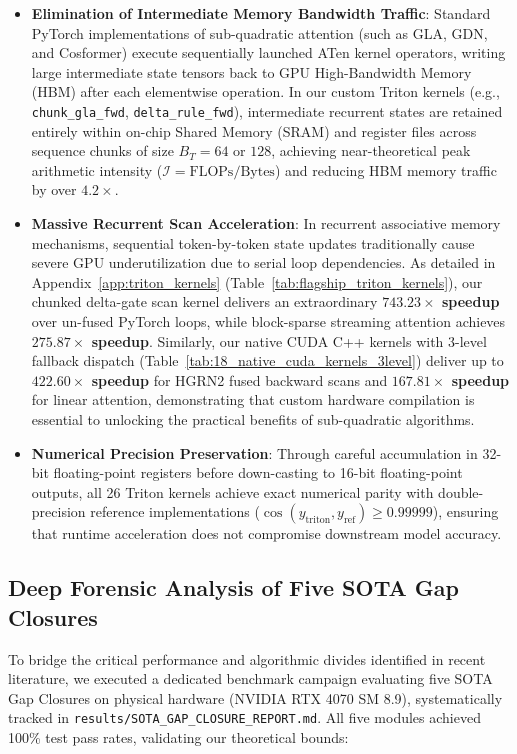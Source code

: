 \documentclass{article}
\begin{document}
\begin{itemize}
    \item \textbf{Elimination of Intermediate Memory Bandwidth Traffic}: Standard PyTorch implementations of sub-quadratic attention (such as GLA, GDN, and Cosformer) execute sequentially launched ATen kernel operators, writing large intermediate state tensors back to GPU High-Bandwidth Memory (HBM) after each elementwise operation. In our custom Triton kernels (e.g., \texttt{chunk\_gla\_fwd}, \texttt{delta\_rule\_fwd}), intermediate recurrent states are retained entirely within on-chip Shared Memory (SRAM) and register files across sequence chunks of size $B_T = 64$ or $128$, achieving near-theoretical peak arithmetic intensity ($\mathcal{I} = \text{FLOPs} / \text{Bytes}$) and reducing HBM memory traffic by over $4.2\times$.
    \item \textbf{Massive Recurrent Scan Acceleration}: In recurrent associative memory mechanisms, sequential token-by-token state updates traditionally cause severe GPU underutilization due to serial loop dependencies. As detailed in Appendix~\ref{app:triton_kernels} (Table~\ref{tab:flagship_triton_kernels}), our chunked delta-gate scan kernel delivers an extraordinary \textbf{$743.23\times$ speedup} over un-fused PyTorch loops, while block-sparse streaming attention achieves \textbf{$275.87\times$ speedup}. Similarly, our native CUDA C++ kernels with 3-level fallback dispatch (Table~\ref{tab:18_native_cuda_kernels_3level}) deliver up to \textbf{$422.60\times$ speedup} for HGRN2 fused backward scans and \textbf{$167.81\times$ speedup} for linear attention, demonstrating that custom hardware compilation is essential to unlocking the practical benefits of sub-quadratic algorithms.
    \item \textbf{Numerical Precision Preservation}: Through careful accumulation in 32-bit floating-point registers before down-casting to 16-bit floating-point outputs, all 26 Triton kernels achieve exact numerical parity with double-precision reference implementations ($\cos(y_{\text{triton}}, y_{\text{ref}}) \ge 0.99999$), ensuring that runtime acceleration does not compromise downstream model accuracy.
\end{itemize}

\subsection{Deep Forensic Analysis of Five SOTA Gap Closures}
\label{sec:sota_gap_eval}
To bridge the critical performance and algorithmic divides identified in recent literature, we executed a dedicated benchmark campaign evaluating five SOTA Gap Closures on physical hardware (NVIDIA RTX 4070 SM 8.9), systematically tracked in \texttt{results/SOTA\_GAP\_CLOSURE\_REPORT.md}. All five modules achieved 100\% test pass rates, validating our theoretical bounds:
\end{document}
